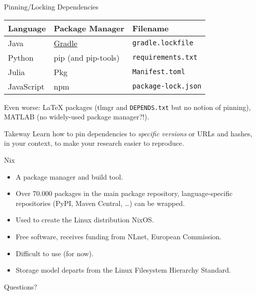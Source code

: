 \documentclass[xcolor={table,usenames,dvipsnames},aspectratio=169]{beamer}
\begin{document}
\begin{frame}{Pinning/Locking Dependencies}

\begin{center}
\begin{tabular}{lll}
Language & Package Manager & Filename \\
\hline
Java & \href{https://docs.gradle.org/7.4.2/userguide/dependency\_locking.html}{Gradle} & \texttt{gradle.lockfile} \\
Python & pip (and pip-tools) & \texttt{requirements.txt} \\
Julia & Pkg & \texttt{Manifest.toml} \\
JavaScript & npm & \texttt{package-lock.json}
\end{tabular}
\end{center}



Even worse: LaTeX packages (tlmgr and \texttt{DEPENDS.txt} but no notion of pinning),
MATLAB (no widely-used package manager?!).

\begin{block}{Takeway}
Learn how to pin dependencies to \emph{specific versions} or URLs and hashes,
in your context, to make your research easier to
reproduce.
\end{block}

\end{frame}

\begin{frame}{Nix}
\begin{itemize}
  \item{A package manager and build tool.}
  \item{Over 70.000 packages in the main package repository, language-specific repositories (PyPI, Maven Central, \dots) can be wrapped.}
  \item{Used to create the Linux distribution NixOS.}
  \item{Free software, receives funding from NLnet, European Commission.}
  \item{Difficult to use (for now).}
  \item{Storage model departs from the Linux Filesystem Hierarchy Standard.}
\end{itemize}
\end{frame}

\begin{frame}[standout]
Questions?
\end{frame}
\end{document}
